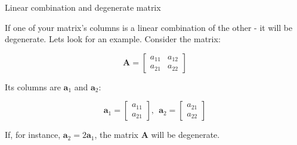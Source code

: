\documentclass{beamer}
\begin{document}
\begin{frame}{Linear combination and degenerate matrix}
	\begin{flushleft}
	
	If one of your matrix's columns is a linear combination of the other - it will be degenerate. Lets look for an example. Consider the matrix:
	
	\begin{equation}
		\mathbf A =
		\begin{bmatrix}
			a_{11}   & a_{12}   \\
			a_{21}   & a_{22}   
		\end{bmatrix}
	\end{equation}
	
	Its columns are $\mathbf a_1$ and $\mathbf a_2$:
	
	\begin{equation}
		\mathbf a_1 =
		\begin{bmatrix}
			a_{11}      \\
			a_{21}     
		\end{bmatrix}, \ \ 
		\mathbf a_2 =
		\begin{bmatrix}
			a_{21}      \\
			a_{22}     
		\end{bmatrix}
	\end{equation}
	
	If, for instance, $\mathbf a_2 = 2 \mathbf a_1$, the matrix $\mathbf A$ will be degenerate.
		
	\end{flushleft}
\end{frame}
\end{document}
